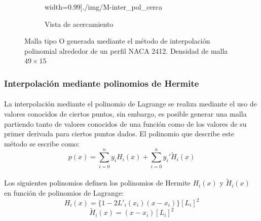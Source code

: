 \documentclass[letterpaper, openright, 12pt]{book}
\begin{document}
\begin{figure}[htbp!]
\begin{subfigure}[c]{0.45\textwidth}
                width=0.99\textwidth]{./img/M-inter_pol_cerca}
            \caption{Vista de acercamiento}
            \label{fig:malla-inter-cerca}
        \end{subfigure}
        \caption[Malla Interpolación Polinomial]{Malla tipo O generada
            mediante el método de interpolación polinomial alrededor de un
            perfil NACA 2412. Densidad de malla $49\times15$}
    \end{figure}

    \subsubsection{Interpolación mediante polinomios de Hermite}
    \paragraph*{}
    La interpolación mediante el polinomio de Lagrange se realiza mediante
    el uso de valores conocidos de ciertos puntos, sin embargo, es posible
    generar una malla partiendo tanto de valores conocidos de una función
    como de los valores de su primer derivada para ciertos puntos dados.
    El polinomio que describe este método se escribe como:
    \begin{equation}
    p(x) = \sum_{i = 0}^{n} y_{i}H_{i}(x) + \sum_{i = 0}^{n}y_{i}\prime \widetilde{H}_{i}(x)
    \end{equation}

    \paragraph*{}
    Los siguientes polinomios definen los polinomios de Hermite $H_{i}(x)$
    y $\widetilde{H}_{i}(x)$
    en función de polinomios de Lagrange:
    \begin{equation}
        H_{i}(x) = \{  1 - 2L\prime_{i}(x_{i})(x - x_{i})\}
        \left[L_{i}\right]^2
    \end{equation}
    \begin{equation}
        \widetilde{H}_{i}(x) = (x - x_{i}) \left[L_{i}\right] ^ 2
    \end{equation}
\end{document}

